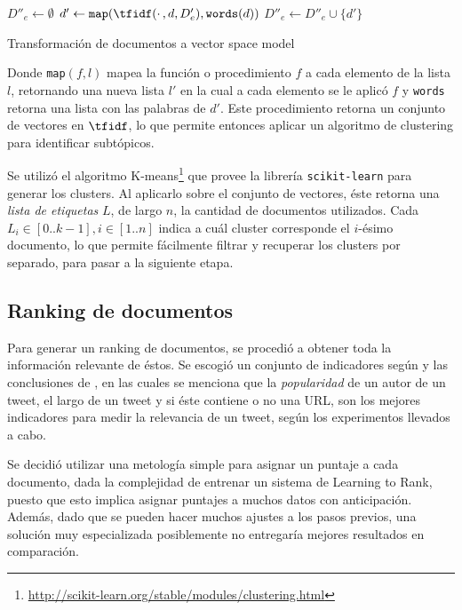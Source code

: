 \documentclass[upright, contnum]{umemoria}
\begin{document}
\begin{algorithm}[H]
$D''_e \leftarrow \emptyset$ \;
 {
   $d' \leftarrow \texttt{map}(\tfidf(\cdotp, d, D'_e), \texttt{words}(d))$\;
}
$D''_e \leftarrow D''_e \cup \{d'\}$\;
\caption{Transformación de documentos a vector space model}
\end{algorithm}

    Donde \texttt{map}$(f,l)$ mapea la
    función o procedimiento $f$ a cada elemento de la lista $l$,
    retornando una nueva lista $l'$ en la cual a cada elemento se le
    aplicó $f$ y \texttt{words} retorna una lista con las palabras de
    $d'$. Este procedimiento retorna un conjunto de vectores en
    $\tfidf$, lo que permite entonces aplicar un algoritmo de
    clustering para identificar subtópicos.

    Se utilizó el algoritmo
    K-means\footnote{\href{http://scikit-learn.org/stable/modules/clustering.html}{http://scikit-learn.org/stable/modules/clustering.html} } 
    que provee la librería
    \texttt{scikit-learn} para generar los clusters. Al
    aplicarlo sobre el conjunto de vectores, éste retorna una 
    \emph{lista de etiquetas} $L$, de largo $n$, la cantidad de documentos
    utilizados. Cada $L_i \in [0..k-1], i \in [1..n]$ indica a cuál
    cluster corresponde el $i$-ésimo documento, lo que permite
    fácilmente filtrar y recuperar los clusters por separado, para
    pasar a la siguiente etapa.


\subsection{Ranking de documentos}
\label{sec-4.2.3}


    Para generar un ranking de documentos, se procedió a obtener toda
    la información relevante de éstos. Se escogió un conjunto de
    indicadores según \cite{Castillo:2011:ICT:1963405.1963500} y las
    conclusiones de \cite{Duan:2010:ESL:1873781.1873815}, en
    las cuales se menciona
    que la \emph{popularidad} de un autor de un tweet, el largo de un tweet
    y si éste contiene o no una URL, son los mejores indicadores para
    medir la relevancia de un tweet, según los experimentos llevados a
    cabo. 

    Se decidió utilizar una metología simple para asignar un puntaje a
    cada documento, dada la complejidad de entrenar un sistema de
    Learning to Rank, puesto que esto implica asignar puntajes a muchos datos con
    anticipación. Además, dado que se pueden hacer muchos ajustes a los
    pasos previos, una solución muy especializada posiblemente no
    entregaría mejores resultados en comparación.
    
\end{document}
